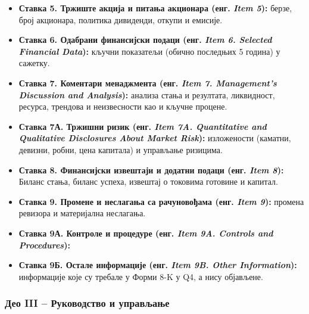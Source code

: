 \begin{itemize}
\item \textbf{Ставка 5. Тржиште акција и питања акционара (енг. \textit{Item 5}):} берзе, број акционара, политика дивиденди, откупи и емисије.

\item \textbf{Ставка 6. Одабрани финансијски подаци (енг. \textit{Item 6. Selected Financial Data}):} кључни показатељи (обично последњих 5 година) у сажетку.

\item \textbf{Ставка 7. Коментари менаджмента (енг. \textit{Item 7. Management's Discussion and Analysis}):} анализа стања и резултата, ликвидност, ресурса, трендова и неизвесности као и кључне процене.

\item \textbf{Ставка 7А. Тржишни ризик (енг. \textit{Item 7A. Quantitative and Qualitative Disclosures About Market Risk}):} изложености (каматни, девизни, робни, цена капитала) и управљање ризицима.

\item \textbf{Ставка 8. Финансијски извештаји и додатни подаци (енг. \textit{Item 8}):} Биланс стања, биланс успеха, извештај о токовима готовине и капитал.

\item \textbf{Ставка 9. Промене и неслагања са рачуновођама (енг. \textit{Item 9}):} промена ревизора и материјална неслагања.

\item \textbf{Ставка 9А. Контроле и процедуре (енг. \textit{Item 9A. Controls and Procedures}):}

\item \textbf{Ставка 9Б. Остале информације (енг. \textit{Item 9B. Other Information}):} информације које су требале у Форми 8-K у Q4, а нису објављене.
\end{itemize}

\subsubsection{Део III – Руководство и управљање}

